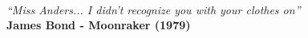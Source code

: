 \
\vfill

\begin{flushright}
    \hfill \textit{``Miss Anders... I didn’t recognize you with your clothes on''} \\
    \bf{James Bond - Moonraker (1979)}
\end{flushright}

\vspace*{1cm}